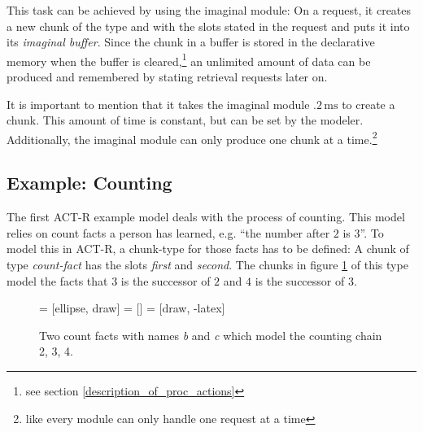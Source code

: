 This task can be achieved by using the imaginal module: On a request, it creates a new chunk of the type and with the slots stated in the request and puts it into its \emph{imaginal buffer}. Since the chunk in a buffer is stored in the declarative memory when the buffer is cleared,\footnote{see section \ref{description_of_proc_actions}} an unlimited amount of data can be produced and remembered by stating retrieval requests later on.

It is important to mention that it takes the imaginal module $.2\,\mathrm{ms}$ to create a chunk. This amount of time is constant, but can be set by the modeler. Additionally, the imaginal module can only produce one chunk at a time.\footnote{like every module can only handle one request at a time}

\subsection{Example: Counting}
\label{example_counting}

The first ACT-R example model deals with the process of counting. This model relies on count facts a person has learned, e.g. ``the number after $2$ is $3$''. To model this in ACT-R, a chunk-type for those facts has to be defined: A chunk of type \emph{count-fact} has the slots \emph{first} and \emph{second}. The chunks in figure \ref{fig:example_counting_chunks} of this type model the facts that $3$ is the successor of $2$ and $4$ is the successor of $3$.

\begin{figure}[htb]
\centering
{} = [ellipse, draw]
 = [] 
 = [draw, -latex]   

\caption{Two count facts with names \emph{b} and \emph{c} which model the counting chain 2, 3, 4.}
\label{fig:example_counting_chunks}
\end{figure}


